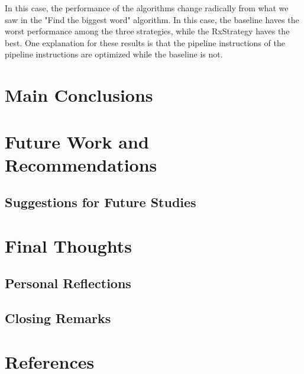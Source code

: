 In this case, the performance of the algorithms change radically from what we saw in the "Find the biggest word" algorithm. In this case, the baseline haves the worst performance among the three strategies, while the RxStrategy haves the best. 
One explanation for these results is that the pipeline instructions of the pipeline instructions are optimized while the baseline is not. 

\section{Main Conclusions}

\section{Future Work and Recommendations}
\subsection{Suggestions for Future Studies}

\section{Final Thoughts}
\subsection{Personal Reflections}
\subsection{Closing Remarks}

\section*{References}



